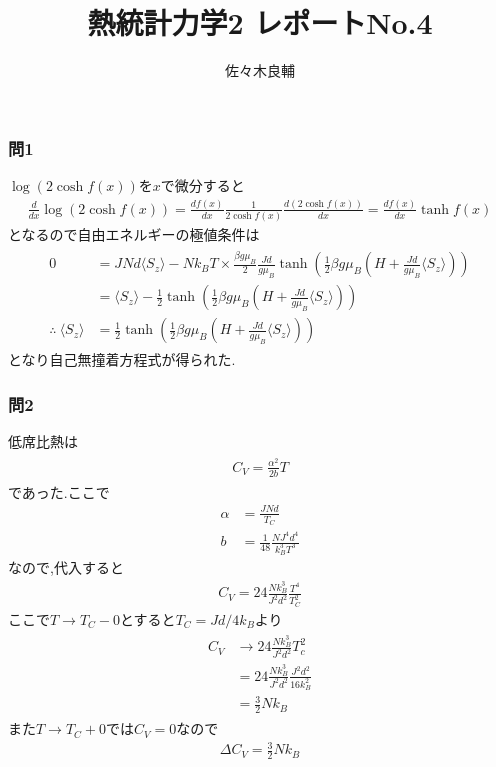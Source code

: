 \documentclass[uplatex,a4j,11pt,dvipdfmx]{jsarticle}
\begin{document}
\title{熱統計力学2 レポートNo.4}
\author{佐々木良輔}
\date{}
\maketitle
\subsubsection*{問1}
$\log(2\cosh f(x))$を$x$で微分すると
\begin{align}
  \frac{d}{dx}\log(2\cosh f(x))=\frac{df(x)}{dx}\frac{1}{2\cosh f(x)}\frac{d(2\cosh f(x))}{dx}=\frac{df(x)}{dx}\tanh f(x)
\end{align}
となるので自由エネルギーの極値条件は
\begin{align}
  \begin{split}
    0&=JNd\langle S_z\rangle-Nk_BT\times\frac{\beta g\mu_B}{2}\frac{Jd}{g\mu_B}\tanh\left(\frac{1}{2}\beta g\mu_B\left(H+\frac{Jd}{g\mu_B}\langle S_z\rangle\right)\right)\\
    &=\langle S_z\rangle-\frac{1}{2}\tanh\left(\frac{1}{2}\beta g\mu_B\left(H+\frac{Jd}{g\mu_B}\langle S_z\rangle\right)\right)\\
    \therefore\ \langle S_z\rangle&=\frac{1}{2}\tanh\left(\frac{1}{2}\beta g\mu_B\left(H+\frac{Jd}{g\mu_B}\langle S_z\rangle\right)\right)
  \end{split}
\end{align}
となり自己無撞着方程式が得られた.
\subsubsection*{問2}
低席比熱は
\begin{align}
  \begin{split}
    C_V=\frac{\alpha^2}{2b}T
  \end{split}
\end{align}
であった.ここで
\begin{align}
  \alpha&=\frac{JNd}{T_C}\\
  b&=\frac{1}{48}\frac{NJ^4d^4}{k_B^3T^3}
\end{align}
なので,代入すると
\begin{align}
  C_V=24\frac{Nk_B^3}{J^2d^2}\frac{T^4}{T_C^2}
\end{align}
ここで$T\rightarrow T_C-0$とすると$T_C=Jd/4k_B$より
\begin{align}
  \begin{split}
    C_V&\rightarrow24\frac{Nk_B^3}{J^2d^2}T_c^2\\
    &=24\frac{Nk_B^3}{J^2d^2}\frac{J^2d^2}{16k_B^2}\\
    &=\frac{3}{2}Nk_B
  \end{split}
\end{align}
また$T\rightarrow T_C+0$では$C_V=0$なので
\begin{align}
  \Delta C_V=\frac{3}{2}Nk_B
\end{align}
\end{document}
